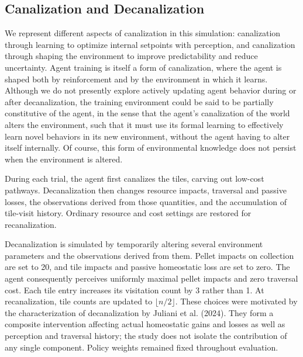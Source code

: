 \documentclass[12pt,fleqn]{article}
\begin{document}
\subsection{Canalization and Decanalization}\label{sec:protocol}

We represent different aspects of canalization in this simulation: canalization through learning to optimize internal setpoints with perception, and canalization through shaping the environment to improve predictability and reduce uncertainty. Agent training is itself a form of canalization, where the agent is shaped both by reinforcement and by the environment in which it learns. Although we do not presently explore actively updating agent behavior during or after decanalization, the training environment could be said to be partially constitutive of the agent, in the sense that the agent's canalization of the world alters the environment, such that it must use its formal learning to effectively learn novel behaviors in its new environment, without the agent having to alter itself internally. Of course, this form of environmental knowledge does not persist when the environment is altered.

During each trial, the agent first canalizes the tiles, carving out low-cost pathways. Decanalization then changes resource impacts, traversal and passive losses, the observations derived from those quantities, and the accumulation of tile-visit history. Ordinary resource and cost settings are restored for recanalization.

Decanalization is simulated by temporarily altering several environment parameters and the observations derived from them. Pellet impacts on collection are set to 20, and tile impacts and passive homeostatic loss are set to zero. The agent consequently perceives uniformly maximal pellet impacts and zero traversal cost. Each tile entry increases its visitation count by 3 rather than 1. At recanalization, tile counts are updated to $\lfloor n/2\rfloor$. These choices were motivated by the characterization of decanalization by Juliani et al. (2024). They form a composite intervention affecting actual homeostatic gains and losses as well as perception and traversal history; the study does not isolate the contribution of any single component. Policy weights remained fixed throughout evaluation.
\end{document}
